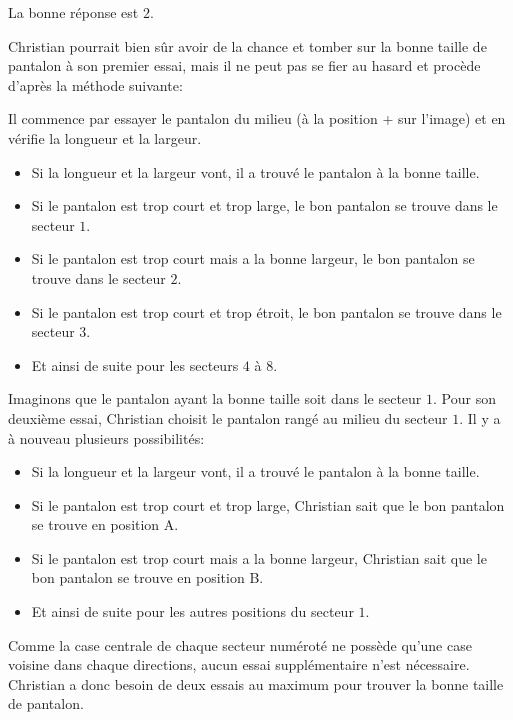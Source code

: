 \documentclass[a4paper,11pt]{report}
\newcommand{\taskGraphicsFolder}{..}
\begin{document}
La bonne réponse est $2$.

Christian pourrait bien sûr avoir de la chance et tomber sur la bonne taille de pantalon à son premier essai, mais il ne peut pas se fier au hasard et procède d’après la méthode suivante:

Il commence par essayer le pantalon du milieu (à la position + sur l’image) et en vérifie la longueur et la largeur.

\begin{itemize}
  \item Si la longueur et la largeur vont, il a trouvé le pantalon à la bonne taille.
  \item Si le pantalon est trop court et trop large, le bon pantalon se trouve dans le secteur $1$.
  \item Si le pantalon est trop court mais a la bonne largeur, le bon pantalon se trouve dans le secteur $2$.
  \item Si le pantalon est trop court et trop étroit, le bon pantalon se trouve dans le secteur $3$.
  \item Et ainsi de suite pour les secteurs $4$ à $8$.
\end{itemize}

{\centering%
\par}

Imaginons que le pantalon ayant la bonne taille soit dans le secteur $1$. Pour son deuxième essai, Christian choisit le pantalon rangé au milieu du secteur $1$. Il y a à nouveau plusieurs possibilités:

\begin{itemize}
  \item Si la longueur et la largeur vont, il a trouvé le pantalon à la bonne taille.
  \item Si le pantalon est trop court et trop large, Christian sait que le bon pantalon se trouve en position A.
  \item Si le pantalon est trop court mais a la bonne largeur, Christian sait que le bon pantalon se trouve en position B.
  \item Et ainsi de suite pour les autres positions du secteur $1$.
\end{itemize}

Comme la case centrale de chaque secteur numéroté ne possède qu’une case voisine dans chaque directions, aucun essai supplémentaire n’est nécessaire. Christian a donc besoin de deux essais au maximum pour trouver la bonne taille de pantalon.
\end{document}
